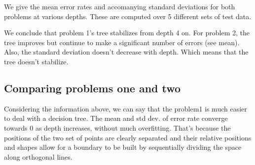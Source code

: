 \documentclass{article}
\begin{document}
We give the mean error rates and accomanying standard deviations for both problems at various depths. These are computed over 5 different sets of test data.

\begin{table}[h]
  \centering
{}
  \caption{\label{tbl_errors}Comparing mean and std dev. of error rates on both problems}
\end{table}

We conclude that problem 1's tree stabilizes from depth 4 on. For problem 2, the tree improves but continue to make a significant number of errors (see mean). Also, the standard deviation doesn't decrease with depth. Which means that the tree doesn't stabilize.

\subsection{Comparing problems one and two}

Considering the information above, we can say that the problem1 is much easier to deal with  a decision tree. The mean and std dev. of error rate converge towards 0 as depth increases, without much overfitting.
That's because the positions of the two set of points are clearly separated and their relative positions and shapes allow for a boundary to be built by sequentially dividing the space along orthogonal lines.
\end{document}

